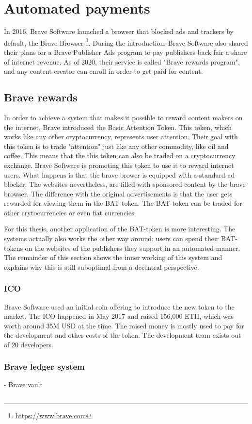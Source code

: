 \section{Automated payments}
In 2016, Brave Software launched a browser that blocked ads and trackers by default, the Brave Browser \footnote{\url{https://www.brave.com}}. During the introduction, Brave Software also shared their plans for a Brave Publisher Ads program to pay publishers back fair a share of internet revenue. As of 2020, their service is called "Brave rewards program", and any content creator can enroll in order to get paid for content. 

\subsection{Brave rewards} 
In order to achieve a system that makes it possible to reward content makers on the internet, Brave introduced the Basic Attention Token. This token, which works like any other cryptocurrency, represents user attention. Their goal with this token is to trade "attention" just like any other commodity, like oil and coffee. This means that the this token can also be traded on a cryptocurrency exchange. Brave Software is promoting this token to use it to reward internet users. What happens is that the brave brower is equipped with a standard ad blocker. The websites nevertheless, are filled with sponsored content by the brave browser. The difference with the original advertisements is that the user gets rewarded for viewing them in the BAT-token. The BAT-token can be traded for other crytocurrencies or even fiat currencies. 

For this thesis, another application of the BAT-token is more interesting. The systems actually also works the other way around: users can spend their BAT-tokens on the websites of the publishers they support in an automated manner. The remainder of this section shows the inner working of this system and explains why this is still suboptimal from a decentral perspective. 




\subsubsection{ICO}
Brave Software used an initial coin offering to introduce the new token to the market. The ICO happened in May 2017 and raised 156,000 ETH, which was worth around 35M USD at the time. The raised money is mostly used to pay for the development and other costs of the token. The development team exists out of 20 developers.

\subsubsection{Brave ledger system}

- Brave vault

\subsection{}




